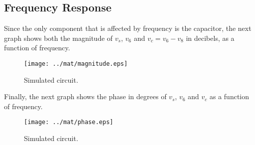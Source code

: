 \subsection{Frequency Response}
Since the only component that is affected by frequency is the capacitor, the next graph shows both the magnitude of $v_s$, $v_6$ and $v_c=v_6 - v_8$ in decibels, as a function of frequency. 

\begin{figure}[H] \centering
\texttt{[image: ../mat/magnitude.eps]}
\caption{Simulated circuit.}
\label{fig:sim_op}
\end{figure}

Finally, the next graph shows the phase in degrees of $v_s$, $v_6$ and $v_c$ as a function of frequency.

\begin{figure}[H] \centering
\texttt{[image: ../mat/phase.eps]}
\caption{Simulated circuit.}
\label{fig:sim_op}
\end{figure}


